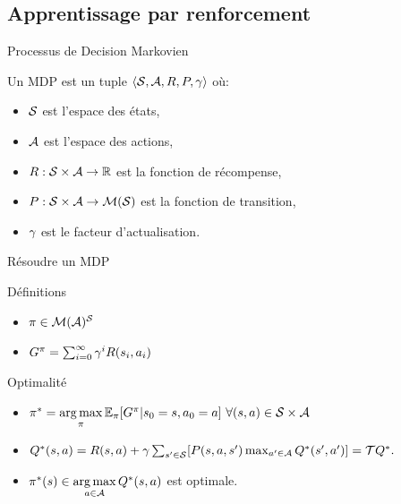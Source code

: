 \documentclass[french]{beamer}
\begin{document}
    \subsection{Apprentissage par renforcement}
    \begin{frame}{Processus de Decision Markovien}

        Un MDP est un tuple $\langle{}\mathcal{S},\mathcal{A},R,P,\gamma\rangle{}$ où:
        \begin{itemize}
            \item  $\mathcal{S}$ est l'espace des états,
            \item  $\mathcal{A}$ est l'espace des actions,
            \item $R: \mathcal{S}\times\mathcal{A} \rightarrow \mathbb{R}$ est la fonction de récompense,
            \item $P: \mathcal{S}\times\mathcal{A} \rightarrow \mathcal{M}(\mathcal{S})$ est la fonction de transition,
            \item $\gamma$ est le facteur d'actualisation.
        \end{itemize}

    \end{frame}

    \begin{frame}{Résoudre un MDP}

        \begin{block}{Définitions}
            \begin{itemize}
                \item  $\pi\in\mathcal{M}(\mathcal{A})^{\mathcal{S}}$ %
                \item  $G^{\pi} = \sum_{i=0}^\infty \gamma^{i} R(s_{i},a_{i})$

            \end{itemize}
        \end{block}
        \pause
        \begin{block}{Optimalité}
            \begin{itemize}
                \pause\item $\pi^* = \operatorname*{arg\,max}\limits_{\pi} \mathbb{E}_{\pi} [G^{\pi}|s_0=s,a_0=a]\ \forall (s,a) \in \mathcal{S}\times\mathcal{A}$
                \pause\item $Q^*(s,a)=R(s,a) +\gamma \sum_{s'\in \mathcal{S}}[P(s,a,s')\max_{a'\in \mathcal{A}}Q^*(s',a')] = \mathcal{T} Q^*.$

                \pause\item $\pi^*(s) \in \operatorname*{arg\,max}\limits_{a\in \mathcal{A}} Q^*(s,a)$ est optimale.
            \end{itemize}
        \end{block}

    \end{frame}
\end{document}
